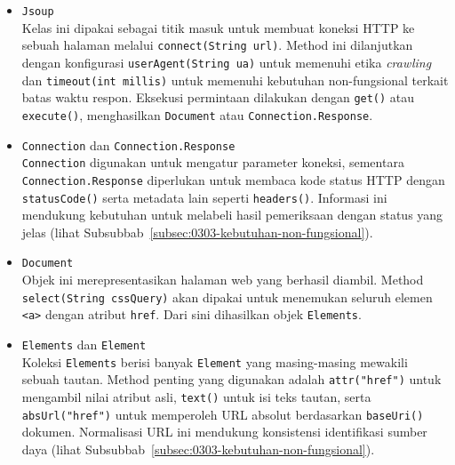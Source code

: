 \begin{itemize}
  \item \texttt{Jsoup}\\
  Kelas ini dipakai sebagai titik masuk untuk membuat koneksi HTTP ke sebuah halaman melalui \texttt{connect(String url)}. Method ini dilanjutkan dengan konfigurasi \texttt{userAgent(String ua)} untuk memenuhi etika \textit{crawling} dan \texttt{timeout(int millis)} untuk memenuhi kebutuhan non-fungsional terkait batas waktu respon. Eksekusi permintaan dilakukan dengan \texttt{get()} atau \texttt{execute()}, menghasilkan \texttt{Document} atau \texttt{Connection.Response}.

  \item \texttt{Connection} dan \texttt{Connection.Response}\\
  \texttt{Connection} digunakan untuk mengatur parameter koneksi, sementara \texttt{Connection.Response} diperlukan untuk membaca kode status HTTP dengan \texttt{statusCode()} serta metadata lain seperti \texttt{headers()}. Informasi ini mendukung kebutuhan untuk melabeli hasil pemeriksaan dengan status yang jelas (lihat Subsubbab~\ref{subsec:0303-kebutuhan-non-fungsional}).

  \item \texttt{Document}\\
  Objek ini merepresentasikan halaman web yang berhasil diambil. Method \texttt{select(String cssQuery)} akan dipakai untuk menemukan seluruh elemen \texttt{<a>} dengan atribut \texttt{href}. Dari sini dihasilkan objek \texttt{Elements}.

  \item \texttt{Elements} dan \texttt{Element}\\
  Koleksi \texttt{Elements} berisi banyak \texttt{Element} yang masing-masing mewakili sebuah tautan. Method penting yang digunakan adalah \texttt{attr("href")} untuk mengambil nilai atribut asli, \texttt{text()} untuk isi teks tautan, serta \texttt{absUrl("href")} untuk memperoleh URL absolut berdasarkan \texttt{baseUri()} dokumen. Normalisasi URL ini mendukung konsistensi identifikasi sumber daya (lihat Subsubbab~\ref{subsec:0303-kebutuhan-non-fungsional}).
\end{itemize}
